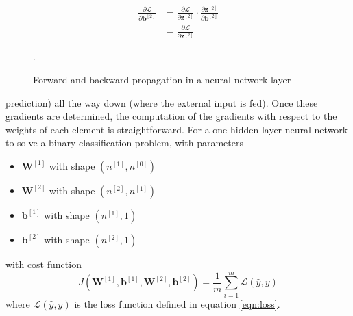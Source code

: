 \documentclass[12pt]{report}
\numberwithin{equation}{section}
\begin{document}
\begin{landscape}
\begin{figure}[t]
\begin{minipage}[b]{.2\linewidth}
\[\begin{split}
\frac{\partial \mathcal{L}}{\partial \mathbf{b}^{[2]}} &= \frac{\partial \mathcal{L}}{\partial \mathbf{z}^{[2]}} \cdot \frac{\partial \mathbf{z}^{[2]}}{\partial \mathbf{b}^{[2]}} \\
	&=  \frac{\partial \mathcal{L}}{\partial \mathbf{z}^{[2]}} 
\end{split}\]
\end{minipage}
\hfill
\begin{minipage}[b]{.2\linewidth}
{ }
\end{minipage}
\vskip 3cm 
.
\caption{Forward and backward propagation in a neural network layer}
\label{fig:wahala}
\end{figure}
\end{landscape}
\noindent 
prediction) all the way down (where the external input is fed). Once these gradients are determined, the computation of the gradients with respect to the weights of each element is straightforward. For a one hidden layer neural network to solve a binary classification problem, with parameters
\begin{multicols}{2}
\begin{itemize}[label=-]
\item $\bm{W}^{[1]}$ with shape $(n^{[1]},n^{[0]})$ 
\item $\bm{W}^{[2]}$ with shape $(n^{[2]},n^{[1]})$
\item $\bm{b}^{[1]}$ with shape $(n^{[1]},1)$
\item $\bm{b}^{[2]}$ with shape $(n^{[2]},1)$
\end{itemize}
\end{multicols}
\noindent
with cost function 
\[
J(\bm{W}^{[1]},\bm{b}^{[1]},\bm{W}^{[2]},\bm{b}^{[2]}) = \frac{1}{m}\sum_{i=1}^m \mathcal{L}(\hat{y},y)
\]
where $\mathcal{L}(\hat{y},y)$ is the loss function defined in equation \eqref{eqn:loss}.
\end{document}

